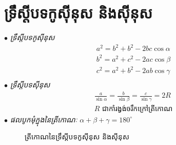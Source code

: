 \section{ទ្រឹស្តីបទកូសុីនុស និងសុីនុស}
\begin{theorem}
	\begin{multicols}{2}
		\emph{\kml $\bullet$ ទ្រឹស្តីបទកូសុីនុស}
		\begin{align*}
		a^{2}=b^{2}+b^{2}-2bc\cos\alpha\\
		b^{2}=a^{2}+c^{2}-2ac\cos\beta\\
		c^{2}=a^{2}+b^{2}-2ab\cos\gamma\\
		\end{align*}
		\emph{\kml $\bullet$ ទ្រឹស្តីបទសុីនុស}
		\begin{align*}
		\frac{a}{\sin \alpha}=\frac{b}{\sin \beta}=\frac{c}{\sin \gamma}=2R\\ \text{$R$ ជាកាំរង្វង់ចរឹកក្រៅត្រីកោណ}
		\end{align*}
		\emph{\kml $\bullet$ ផលបូកមុំក្នុងនៃត្រីកោណៈ} $\alpha + \beta + \gamma=180^\circ$
		\begin{figure}[H]
			\centering
			\caption{ត្រីកោណនៃទ្រឹស្តីបទកូសុីនុស និងសុីនុស}
		\end{figure}
	\end{multicols}
\end{theorem}
